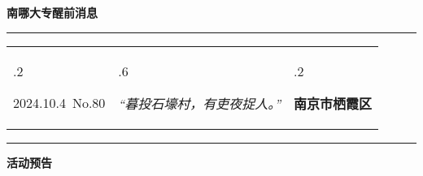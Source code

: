 \documentclass[letterpaper, 12pt]{article}
\begin{document}
\begin{center}
    \Huge\textbf{南哪大专醒前消息}
\end{center}
\vspace{4mm}
\hrule
\renewcommand\tabularxcolumn[1]{m{#1}}
\begin{tabularx}{\textwidth}{>{\hsize.2\hsize}X>{\hsize.6\hsize}X>{\hsize.2\hsize}X}
    \begin{flushleft}
        2024.10.4\, No.80
    \end{flushleft}
    &
    \begin{center}
        \textit{“暮投石壕村，有吏夜捉人。”}
    \end{center}
    &
    \begin{flushright}
        \textbf{南京市栖霞区}
    \end{flushright}
\end{tabularx}
\vspace{-3.5mm}
\hrule
\vspace{4mm}
\centerline{\huge\textbf{活动预告}}
\end{document}
